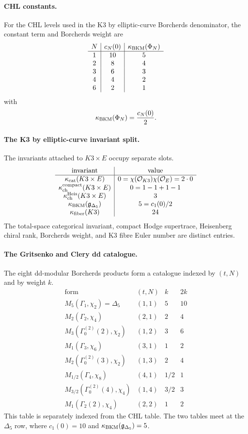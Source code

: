 \paragraph{CHL constants.}
For the CHL levels used in the K3 by elliptic-curve Borcherds
denominator, the constant term and Borcherds weight are
\[
\begin{array}{c|c|c}
N & c_N(0) & \kappa_{\mathrm{BKM}}(\Phi_N)\\
\hline
1 & 10 & 5\\
2 & 8 & 4\\
3 & 6 & 3\\
4 & 4 & 2\\
6 & 2 & 1
\end{array}
\]
with
\[
  \kappa_{\mathrm{BKM}}(\Phi_N)=\frac{c_N(0)}{2}.
\]

\paragraph{The K3 by elliptic-curve invariant split.}
The invariants attached to \(K3\times E\) occupy separate slots.
\[
\begin{array}{c|c}
\text{invariant} & \text{value}\\
\hline
\kappa_{\mathrm{cat}}(K3\times E) & 0=\chi(\mathcal O_{K3})\chi(\mathcal O_E)=2\cdot 0\\
\kappa_{\mathrm{ch}}^{\mathrm{compact}}(K3\times E) & 0=1-1+1-1\\
\kappa_{\mathrm{ch}}^{\mathrm{Heis}}(K3\times E) & 3\\
\kappa_{\mathrm{BKM}}(\mathfrak g_{\Delta_5}) & 5=c_1(0)/2\\
\kappa_{\mathrm{fiber}}(K3) & 24
\end{array}
\]
The total-space categorical invariant, compact Hodge supertrace,
Heisenberg chiral rank, Borcherds weight, and K3 fibre Euler number
are distinct entries.

\paragraph{The Gritsenko and Clery dd catalogue.}
The eight dd-modular Borcherds products form a catalogue indexed by
\((t,N)\) and by weight \(k\).
\[
\begin{array}{c|c|c|c}
\text{form} & (t,N) & k & 2k\\
\hline
M_5(\Gamma_1,\chi_2)=\Delta_5 & (1,1) & 5 & 10\\
M_2(\Gamma_2,\chi_4) & (2,1) & 2 & 4\\
M_3(\Gamma^{(2)}_0(2),\chi_2) & (1,2) & 3 & 6\\
M_1(\Gamma_3,\chi_6) & (3,1) & 1 & 2\\
M_2(\Gamma^{(2)}_0(3),\chi_2) & (1,3) & 2 & 4\\
M_{1/2}(\Gamma_4,\chi_8) & (4,1) & 1/2 & 1\\
M_{3/2}(\Gamma^{(2)}_0(4),\chi_4) & (1,4) & 3/2 & 3\\
M_1(\Gamma_2(2),\chi_4) & (2,2) & 1 & 2
\end{array}
\]
This table is separately indexed from the CHL table. The two tables
meet at the \(\Delta_5\) row, where \(c_1(0)=10\) and
\(\kappa_{\mathrm{BKM}}(\mathfrak g_{\Delta_5})=5\).
